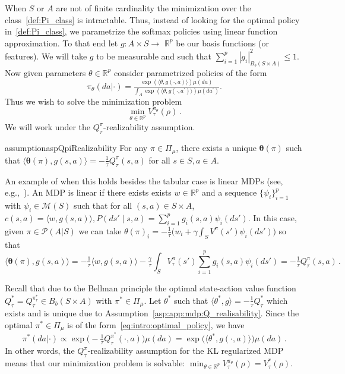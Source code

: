 \documentclass{amsart}
\theoremstyle{definition}
\begin{document}
When $S$ or $A$ are not of finite cardinality the minimization over the class~\ref{def:Pi_class} is intractable. 
Thus, instead of looking for the optimal policy in~\ref{def:Pi_class}, we parametrize the softmax policies using linear function approximation.
To that end let $g: A \times S \rightarrow$ $\mathbb{R}^p$ be our basis functions (or features). 
We will take $g$ to be measurable and such that $\sum_{i=1}^p|g_i|_{B_b(S\times A)}^2 \leq 1$.
Now given parameters $\theta \in \mathbb R^p$ consider parametrized policies of the form
\[
\pi_\theta(da|\cdot)=\tfrac{\exp \left(\langle\theta,g(\cdot,a)\rangle\right)\mu(da)}{\int_{A} \exp \left(\langle\theta,g(\cdot,a^\prime)\rangle\right)\mu(da^\prime)}.
\]
Thus we wish to solve the minimization problem
\begin{equation}\label{eq:intro:entropy regularized mdp0}
\min_{\theta \in \mathbb{R}^p} V_\tau^{\pi_\theta}(\rho)\,.
\end{equation}
We will work under the $Q^\pi_\tau$-realizability assumption.

\begin{restatable}{assumption}{aspQpiRealizability}\label{asp:app:mdp:Q_realisability}
For any $\pi \in \Pi_\mu$, there exists a unique $\boldsymbol{\theta}(\pi)$ such that $\langle \boldsymbol{\theta}(\pi), g(s,a) \rangle = -\frac{1}{\tau} Q^{\pi}_\tau(s,a)$ for all $s \in S, a \in A$.
\end{restatable}

An example of when this holds besides the tabular case is linear MDPs (see, e.g.,~\cite{yang2019sample, zanette2020frequentist, li2021sample}). 
An MDP is linear if there exists exists $w\in \mathbb{R}^p$ and a sequence $\{\psi_i\}_{i=1}^p$ with $\psi_i \in \mathcal{M}(S)$ such that for all $(s,a)\in S \times A$, $c(s,a)=\langle w,g(s,a)\rangle, P( d s'\mid s,a)=\sum_{i=1}^p g_i(s,a)\psi_i( d s')$.
In this case, given $\pi \in \mathcal P(A|S)$ we can take $\mathbb{\theta}(\pi)_i = -\tfrac1\tau\big(w_i + \gamma\int_{S} V^{\pi}(s')\psi_i(ds')\big)$ 
so that 
\[
\langle \boldsymbol{\theta}(\pi), g(s,a) \rangle = -\tfrac1\tau\langle w, g(s,a)\rangle -\tfrac\gamma\tau \textstyle \int_S V^{\pi}_\tau(s') \sum_{i=1}^p g_i(s,a)\psi_i(ds') = -\tfrac1\tau Q^\pi_\tau(s,a)\,.
\]

Recall that due to the Bellman principle the optimal state-action value function $Q^\ast_\tau = Q^{\pi_\tau^\ast}_\tau \in B_b(S\times A)$ with $\pi^\ast \in \Pi_\mu$.
Let $\theta^*$ such that $\langle \theta^*,g\rangle = -\frac{1}{\tau}Q^{*}_\tau$ which exists and is unique due to Assumption~\ref{asp:app:mdp:Q_realisability}.
Since the optimal $\pi^* \in \Pi_\mu$ is of the form~\eqref{eq:intro:optimal_policy}, we have  
\[\pi^*(da 
| \cdot) \propto \exp\big(-\tfrac{1}{\tau}Q^{\pi^*}_\tau(\cdot,a)\big) \mu(da) = \exp\big(\langle \theta^*, g(\cdot,a) \rangle \big) \mu(da)\,.
\]
In other words, the $Q^\pi_\tau$-realizability assumption for the KL regularized MDP means that our minimization problem is solvable: $\min_{\theta \in \mathbb{R}^p} V_\tau^{\pi_\theta}(\rho) = V^*_\tau(\rho)$.
\end{document}
